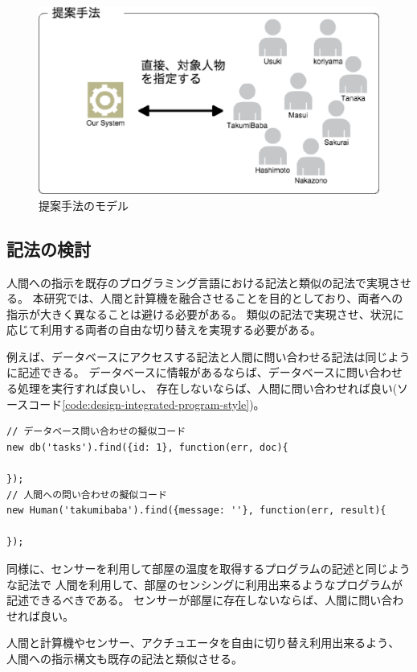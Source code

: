 \begin{figure}[htbp]
  \begin{center}
  \includegraphics[width=.5\linewidth]{images/unique_id_model.eps}
  \end{center}
  \caption{提案手法のモデル}
  \label{fig:unique_id_model}
\end{figure}

\subsection{記法の検討}\label{ux8a18ux6cd5ux306eux691cux8a0e}

人間への指示を既存のプログラミング言語における記法と類似の記法で実現させる。
本研究では、人間と計算機を融合させることを目的としており、両者への指示が大きく異なることは避ける必要がある。
類似の記法で実現させ、状況に応じて利用する両者の自由な切り替えを実現する必要がある。

例えば、データベースにアクセスする記法と人間に問い合わせる記法は同じように記述できる。
データベースに情報があるならば、データベースに問い合わせる処理を実行すれば良いし、
存在しないならば、人間に問い合わせれば良い(ソースコード\ref{code:design-integrated-program-style})。

\begin{lstlisting}[caption=人間への指示を計算機への指示と類似させる, label=code:design-integrated-program-style]
// データベース問い合わせの擬似コード
new db('tasks').find({id: 1}, function(err, doc){

});
// 人間への問い合わせの擬似コード
new Human('takumibaba').find({message: ''}, function(err, result){

});
\end{lstlisting}

同様に、センサーを利用して部屋の温度を取得するプログラムの記述と同じような記法で
人間を利用して、部屋のセンシングに利用出来るようなプログラムが記述できるべきである。
センサーが部屋に存在しないならば、人間に問い合わせれば良い。

人間と計算機やセンサー、アクチュエータを自由に切り替え利用出来るよう、
人間への指示構文も既存の記法と類似させる。

